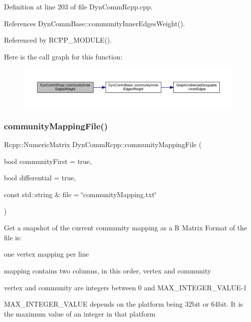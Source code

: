 Definition at line 203 of file Dyn\+Comm\+Rcpp.\+cpp.



References Dyn\+Comm\+Base\+::community\+Inner\+Edges\+Weight().



Referenced by R\+C\+P\+P\+\_\+\+M\+O\+D\+U\+L\+E().

Here is the call graph for this function\+:
\nopagebreak
\begin{figure}[H]
\begin{center}
\leavevmode
\includegraphics[width=350pt]{classDynCommRcpp_aed6b4f1e844956429eb9a15d8d6df7b6_cgraph}
\end{center}
\end{figure}
\mbox{\label{classDynCommRcpp_a132aff4ca6f76fd006b2faccbfd01e04}} 
\subsubsection{\texorpdfstring{community\+Mapping\+File()}{communityMappingFile()}}
{\footnotesize\ttfamily Rcpp\+::\+Numeric\+Matrix Dyn\+Comm\+Rcpp\+::community\+Mapping\+File (\begin{DoxyParamCaption}\item[{bool}]{community\+First = {\ttfamily true},  }\item[{bool}]{differential = {\ttfamily true},  }\item[{const std\+::string \&}]{file = {\ttfamily \char`\"{}communityMapping.txt\char`\"{}} }\end{DoxyParamCaption})\hspace{0.3cm}{\ttfamily [inline]}}

Get a snapshot of the current community mapping as a R Matrix Format of the file is\+:
\begin{DoxyItemize}
\item one vertex mapping per line
\item mapping contains two columns, in this order, vertex and community
\item vertex and community are integers between 0 and M\+A\+X\+\_\+\+I\+N\+T\+E\+G\+E\+R\+\_\+\+V\+A\+L\+U\+E-\/1
\item M\+A\+X\+\_\+\+I\+N\+T\+E\+G\+E\+R\+\_\+\+V\+A\+L\+UE depends on the platform being 32bit or 64bit. It is the maximum value of an integer in that platform 
\end{DoxyItemize}

